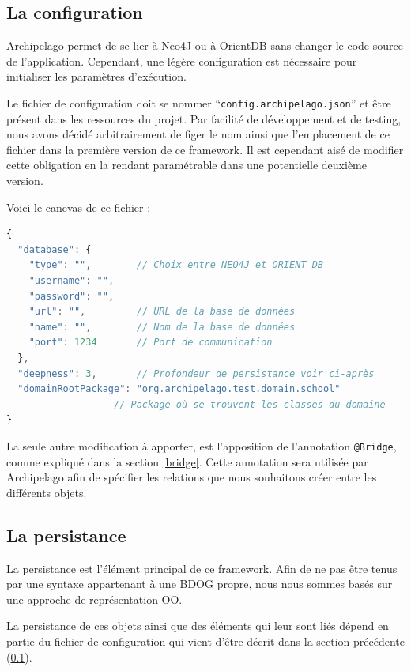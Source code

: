 \documentclass[a4paper,fleqn,12pt,oneside]{book}
\begin{document}
\subsection{La configuration}
\label{configuration}
Archipelago permet de se lier à Neo4J ou à OrientDB sans changer le code source de l'application. 
Cependant, une légère configuration est nécessaire pour initialiser les paramètres d'exécution.

Le fichier de configuration doit se nommer \enquote{\texttt{config.archipelago.json}} et être présent dans les ressources du projet. Par facilité de développement et de testing, nous avons décidé arbitrairement de figer le nom ainsi que l'emplacement de ce fichier dans la première version de ce framework. Il est cependant aisé de modifier cette obligation en la rendant paramétrable dans une potentielle deuxième version.

Voici le canevas de ce fichier :

\begin{lstlisting}[language=JavaScript]
{
  "database": {
    "type": "",        // Choix entre NEO4J et ORIENT_DB
    "username": "",
    "password": "",
    "url": "",         // URL de la base de données
    "name": "",        // Nom de la base de données
    "port": 1234       // Port de communication
  },
  "deepness": 3,       // Profondeur de persistance voir ci-après
  "domainRootPackage": "org.archipelago.test.domain.school" 
                   // Package où se trouvent les classes du domaine 
}
\end{lstlisting}

La seule autre modification à apporter, est l'apposition de l'annotation \texttt{@Bridge}, comme expliqué dans la section \ref{bridge}. Cette annotation sera utilisée par Archipelago afin de spécifier les relations que nous souhaitons créer entre les différents objets.

\subsection{La persistance}
\label{persistance}

La persistance est l'élément principal de ce framework. Afin de ne pas être tenus par une syntaxe appartenant à une BDOG propre, nous nous sommes basés sur une approche de représentation OO. 

La persistance de ces objets ainsi que des éléments qui leur sont liés dépend en partie du fichier de configuration qui vient d'être décrit dans la section précédente (\ref{configuration}). 
\end{document}
